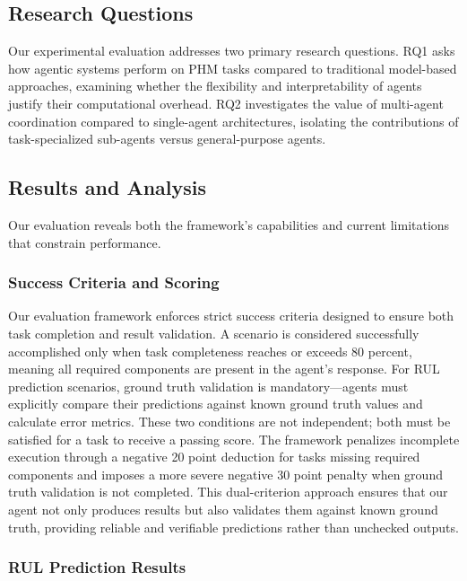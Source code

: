\documentclass[conference]{IEEEtran}
\begin{document}
\subsection{Research Questions}

Our experimental evaluation addresses two primary research questions. RQ1 asks how agentic systems perform on PHM tasks compared to traditional model-based approaches, examining whether the flexibility and interpretability of agents justify their computational overhead. RQ2 investigates the value of multi-agent coordination compared to single-agent architectures, isolating the contributions of task-specialized sub-agents versus general-purpose agents.

\subsection{Results and Analysis}

Our evaluation reveals both the framework's capabilities and current limitations that constrain performance.

\subsubsection{Success Criteria and Scoring}

Our evaluation framework enforces strict success criteria designed to ensure both task completion and result validation. A scenario is considered successfully accomplished only when task completeness reaches or exceeds 80 percent, meaning all required components are present in the agent's response. For RUL prediction scenarios, ground truth validation is mandatory—agents must explicitly compare their predictions against known ground truth values and calculate error metrics. These two conditions are not independent; both must be satisfied for a task to receive a passing score. The framework penalizes incomplete execution through a negative 20 point deduction for tasks missing required components and imposes a more severe negative 30 point penalty when ground truth validation is not completed. This dual-criterion approach ensures that our agent not only produces results but also validates them against known ground truth, providing reliable and verifiable predictions rather than unchecked outputs.

\subsubsection{RUL Prediction Results}
\end{document}
